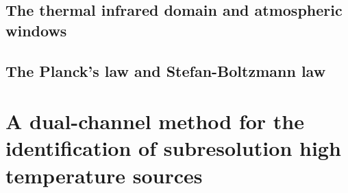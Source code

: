 
\subsection{The thermal infrared  domain and atmospheric windows}


\subsection{The Planck's law and Stefan-Boltzmann law}


\section{A dual-channel method for the identification of subresolution high temperature sources}


